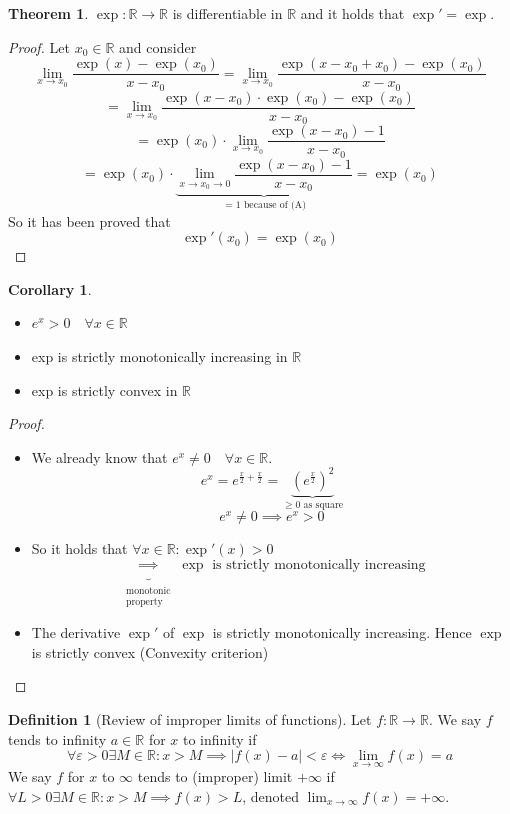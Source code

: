 \documentclass[a4paper,landscape,twocolumn]{article}
\theoremstyle{definition}
\newtheorem{theorem}{Theorem}
\newtheorem{defi}{Definition}
\newtheorem{cor}{Corollary}
\newcommand\abs[1]{\left|#1\right|}
\begin{document}
\begin{theorem}
  $\exp: \mathbb R \to \mathbb R$ is differentiable in $\mathbb R$ and it holds that
  $\exp' = \exp$.
\end{theorem}
\begin{proof}
  Let $x_0 \in \mathbb R$ and consider
  \[
    \lim_{x \to x_0} \frac{\exp(x) - \exp(x_0)}{x - x_0}
    = \lim_{x \to x_0} \frac{\exp(x - x_0 + x_0) - \exp(x_0)}{x - x_0}
  \] \[
    = \lim_{x \to x_0} \frac{\exp(x - x_0) \cdot \exp(x_0) - \exp(x_0)}{x - x_0}
  \] \[
    = \exp(x_0) \cdot \lim_{x \to x_0} \frac{\exp(x - x_0) - 1}{x - x_0}
  \] \[
    = \exp(x_0) \cdot \underbrace{\lim_{x \to x_0 \to 0} \frac{\exp(x - x_0) - 1}{x - x_0}}_{= 1 \text{ because of (A)}}
    = \exp(x_0)
  \]
  So it has been proved that
  \[ \exp'(x_0) = \exp(x_0) \]
\end{proof}
%
\begin{cor}
  \begin{itemize}
    \item $e^x > 0 \quad \forall x \in \mathbb R$
    \item exp is strictly monotonically increasing in $\mathbb R$
    \item exp is strictly convex in $\mathbb R$
  \end{itemize}
\end{cor}
\begin{proof}
  \begin{itemize}
    \item
      We already know that $e^x \neq 0 \quad \forall x \in \mathbb R$.
      \[ e^x = e^{\frac x2 + \frac x2} = \underbrace{\left(e^{\frac x2}\right)^2}_{\geq 0 \text{ as square}} \]
      \[ e^x \neq 0 \implies e^x > 0 \]
    \item
      So it holds that $\forall x \in \mathbb R: \exp'(x) > 0$
      \[
        \underbrace{\implies}_{\substack{\text{monotonic} \\ \text{property}}}
        \exp \text{ is strictly monotonically increasing}
      \]
    \item
      The derivative $\exp'$ of $\exp$ is strictly monotonically increasing.
      Hence $\exp$ is strictly convex (Convexity criterion)
  \end{itemize}
\end{proof}
\begin{defi}[Review of improper limits of functions]
  Let $f: \mathbb R \to \mathbb R$. We say $f$ tends to infinity $a \in \mathbb R$
  for $x$ to infinity if
  \[
    \forall \varepsilon > 0 \exists M \in \mathbb R: x > M \implies \abs{f(x) - a} < \varepsilon
    \iff \lim_{x \to \infty} f(x) = a
  \]
  We say $f$ for $x$ to $\infty$ tends to (improper) limit $+\infty$
  if $\forall L > 0 \exists M \in \mathbb R: x > M \implies f(x) > L$,
  denoted $\lim_{x \to \infty} f(x) = +\infty$.
\end{defi}
\end{document}
